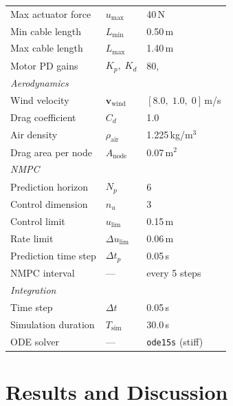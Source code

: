\documentclass[conference]{IEEEtran}
\begin{document}
\begin{table}[htbp]
\begin{tabular}{l l l}
Max actuator force         & $u_{\max}$       & 40\,N \\
Min cable length           & $L_{\min}$       & 0.50\,m \\
Max cable length           & $L_{\max}$       & 1.40\,m \\
Motor PD gains             & $K_p,\;K_d$      & 80,\;12 \\
\hline
\multicolumn{3}{l}{\textit{Aerodynamics}} \\
Wind velocity              & $\mathbf{v}_{\mathrm{wind}}$ & $[8.0,\;1.0,\;0]$\,m/s \\
Drag coefficient           & $C_d$            & 1.0 \\
Air density                & $\rho_{\mathrm{air}}$ & 1.225\,kg/m$^3$ \\
Drag area per node         & $A_{\mathrm{node}}$  & 0.07\,m$^2$ \\
\hline
\multicolumn{3}{l}{\textit{NMPC}} \\
Prediction horizon         & $N_p$            & 6 \\
Control dimension          & $n_u$            & 3 \\
Control limit              & $u_{\mathrm{lim}}$  & 0.15\,m \\
Rate limit                 & $\Delta u_{\mathrm{lim}}$ & 0.06\,m \\
Prediction time step       & $\Delta t_p$     & 0.05\,s \\
NMPC interval              & ---              & every 5 steps \\
\hline
\multicolumn{3}{l}{\textit{Integration}} \\
Time step                  & $\Delta t$       & 0.05\,s \\
Simulation duration        & $T_{\mathrm{sim}}$ & 30.0\,s \\
ODE solver                 & ---              & \texttt{ode15s} (stiff) \\
\hline
\end{tabular}
\end{table}

\section{Results and Discussion}
\end{document}
